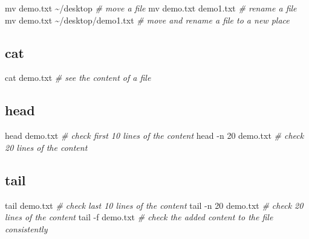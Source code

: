\documentclass[
]{book}
\newenvironment{Shaded}{\begin{snugshade}}{\end{snugshade}}
\newcommand{\AttributeTok}[1]{\textcolor[rgb]{0.77,0.63,0.00}{#1}}
\newcommand{\CommentTok}[1]{\textcolor[rgb]{0.56,0.35,0.01}{\textit{#1}}}
\newcommand{\FunctionTok}[1]{\textcolor[rgb]{0.00,0.00,0.00}{#1}}
\newcommand{\NormalTok}[1]{#1}
\begin{document}
\begin{Shaded}
\begin{Highlighting}[]
\FunctionTok{mv}\NormalTok{ demo.txt \textasciitilde{}/desktop }\CommentTok{\# move a file}
\FunctionTok{mv}\NormalTok{ demo.txt demo1.txt }\CommentTok{\# rename a file}
\FunctionTok{mv}\NormalTok{ demo.txt \textasciitilde{}/desktop/demo1.txt }\CommentTok{\# move and rename a file to a new place}
\end{Highlighting}
\end{Shaded}

\hypertarget{cat}{%
\subsection*{cat}\label{cat}}

\begin{Shaded}
\begin{Highlighting}[]
\FunctionTok{cat}\NormalTok{ demo.txt }\CommentTok{\# see the content of a file}
\end{Highlighting}
\end{Shaded}

\hypertarget{head}{%
\subsection*{head}\label{head}}

\begin{Shaded}
\begin{Highlighting}[]
\FunctionTok{head}\NormalTok{ demo.txt }\CommentTok{\# check first 10 lines of the content}
\FunctionTok{head} \AttributeTok{{-}n}\NormalTok{ 20 demo.txt }\CommentTok{\# check 20 lines of the content}
\end{Highlighting}
\end{Shaded}

\hypertarget{tail}{%
\subsection*{tail}\label{tail}}

\begin{Shaded}
\begin{Highlighting}[]
\FunctionTok{tail}\NormalTok{ demo.txt }\CommentTok{\# check last 10 lines of the content}
\FunctionTok{tail} \AttributeTok{{-}n}\NormalTok{ 20 demo.txt }\CommentTok{\# check 20 lines of the content}
\FunctionTok{tail} \AttributeTok{{-}f}\NormalTok{ demo.txt }\CommentTok{\# check the added content to the file consistently}
\end{Highlighting}
\end{Shaded}
\end{document}
